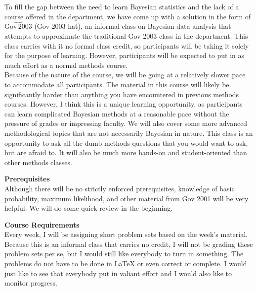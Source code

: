 \documentclass[10pt,a4paper]{article}
\begin{document}
To fill the gap between the need to learn Bayesian statistics and the lack of a course offered in the department, we have come up with a solution in the form of $\widehat{\mathrm{Gov} \, 2003}$ (Gov 2003 hat), an informal class on Bayesian data analysis that attempts to approximate the traditional Gov 2003 class in the department.  This class carries with it no formal class credit, so participants will be taking it solely for the purpose of learning.  However, participants will be expected to put in as much effort as a normal methods course.  \\

Because of the nature of the course, we will be going at a relatively slower pace to accommodate all participants.  The material in this course will likely be significantly harder than anything you have encountered in previous methods courses.  However, I think this is a unique learning opportunity, as participants can learn complicated Bayesian methods at a reasonable pace without the pressure of grades or impressing faculty.  We will also cover some more advanced methodological topics that are not necessarily Bayesian in nature.  This class is an opportunity to ask all the dumb methods questions that you would want to ask, but are afraid to.  It will also be much more hands-on and student-oriented than other methods classes.\\

\bigskip

\textbf{Prerequisites} \\

Although there will be no strictly enforced prerequisites, knowledge of basic probability, maximum likelihood, and other material from Gov 2001 will be very helpful.  We will do some quick review in the beginning. \\

\bigskip

\textbf{Course Requirements} \\

Every week, I will be assigning short problem sets based on the week's material.  Because this is an informal class that carries no credit, I will not be grading these problem sets per se, but I would still like everybody to turn in something.  The problems do not have to be done in \LaTeX \hspace{1pt} or even correct or complete.  I would just like to see that everybody put in valiant effort and I would also like to monitor progress.  \\
\end{document}
